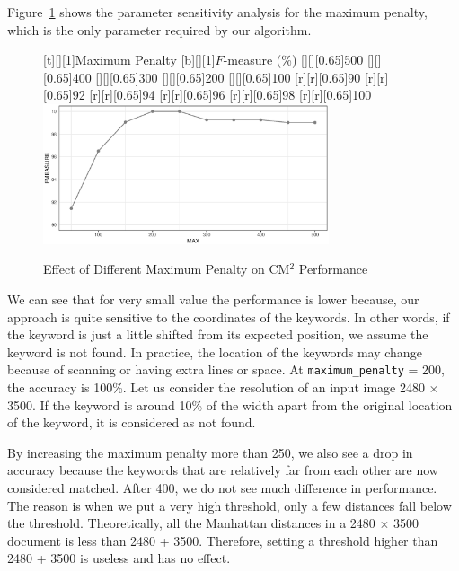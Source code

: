 Figure~\ref{penalty} shows the parameter sensitivity analysis for the maximum penalty, which is the only parameter required by our algorithm.
\begin{figure}
\centering
{}[t][][1]{Maximum Penalty}
[b][][1]{$F$-measure (\%)}
[][][0.65]{500}
[][][0.65]{400}
[][][0.65]{300}
[][][0.65]{200}
[][][0.65]{100}
[r][r][0.65]{90}
[r][r][0.65]{92}
[r][r][0.65]{94}
[r][r][0.65]{96}
[r][r][0.65]{98}
[r][r][0.65]{100}
\includegraphics[width=0.75\textwidth]{penalty}
\caption{Effect of Different Maximum Penalty on CM$^2$ Performance}\label{penalty}
\end{figure}
We can see that for very small value the performance is lower because, our approach is quite sensitive to the coordinates of the keywords. In other words, if the keyword is just a little shifted from its expected position, we assume the keyword is not found. In practice, the location of the keywords may change because of scanning or having extra lines or space. At \texttt{maximum\_penalty} = 200, the accuracy is 100\%. Let us consider the resolution of an input image 2480 $\times$ 3500. If the keyword is around 10\% of the width apart from the original location of the keyword, it is considered as not found.

By increasing the maximum penalty more than 250, we also see a drop in accuracy because the keywords that are relatively far from each other are now considered matched. After 400, we do not see much difference in performance. The reason is when we put a very high threshold, only a few distances fall below the threshold. Theoretically, all the Manhattan distances in a 2480 $\times$ 3500 document is less than 2480 + 3500. Therefore, setting a threshold higher than 2480 + 3500 is useless and has no effect.

